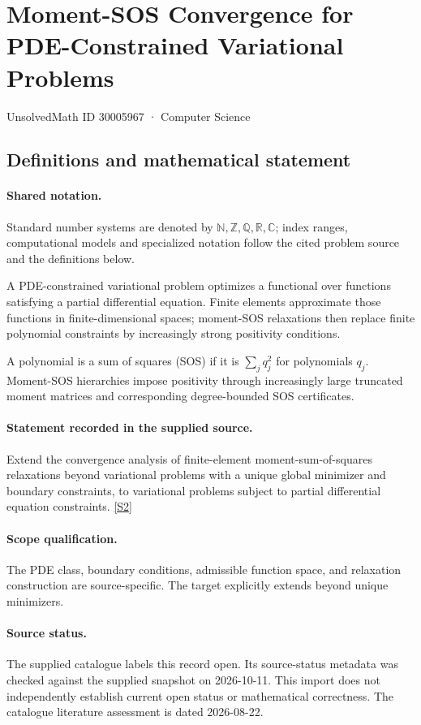 \documentclass[11pt]{article}
\newcommand{\sref}[2]{\hyperlink{source:#1:#2}{[S#2]}}
\begin{document}
\setcounter{section}{30005966}
\section{Moment-SOS Convergence for PDE-Constrained Variational Problems}\label{30005967}
{\small\sffamily UnsolvedMath ID 30005967 · Computer Science}
\subsection{Definitions and mathematical statement}

\paragraph{Shared notation.}Standard number systems are denoted by $\mathbb N,\mathbb Z,\mathbb Q,\mathbb R,\mathbb C$; index ranges, computational models and specialized notation follow the cited problem source and the definitions below.


A PDE-constrained variational problem optimizes a functional over functions satisfying a partial differential equation. Finite elements approximate those functions in finite-dimensional spaces; moment-SOS relaxations then replace finite polynomial constraints by increasingly strong positivity conditions.

A polynomial is a sum of squares (SOS) if it is $\sum_j q_j^2$ for polynomials $q_j$. Moment-SOS hierarchies impose positivity through increasingly large truncated moment matrices and corresponding degree-bounded SOS certificates.
\paragraph{Statement recorded in the supplied source.}
Extend the convergence analysis of finite-element moment-sum-of-squares relaxations beyond variational problems with a unique global minimizer and boundary constraints, to variational problems subject to partial differential equation constraints. \sref{30005967}{2}
\paragraph{Scope qualification.}
The PDE class, boundary conditions, admissible function space, and relaxation construction are source-specific. The target explicitly extends beyond unique minimizers.
\paragraph{Source status.}
The supplied catalogue labels this record open. Its source-status metadata was checked against the supplied snapshot on 2026-10-11. This import does not independently establish current open status or mathematical correctness. The catalogue literature assessment is dated 2026-08-22.
\end{document}
